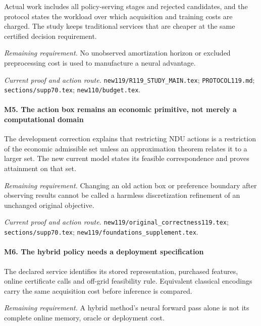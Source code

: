 Actual work includes all policy-serving stages and rejected candidates, and the protocol states the workload over which acquisition and training costs are charged. The study keeps traditional services that are cheaper at the same certified decision requirement.

\par\emph{Remaining requirement.} No unobserved amortization horizon or excluded preprocessing cost is used to manufacture a neural advantage.

\par\emph{Current proof and action route.} \nolinkurl{new119/R119_STUDY_MAIN.tex}; \nolinkurl{PROTOCOL119.md}; \nolinkurl{sections/supp70.tex}; \nolinkurl{new110/budget.tex}.

\paragraph{M5. The action box remains an economic primitive, not merely a computational domain}

The development correction explains that restricting NDU actions is a restriction of the economic admissible set unless an approximation theorem relates it to a larger set. The new current model states its feasible correspondence and proves attainment on that set.

\par\emph{Remaining requirement.} Changing an old action box or preference boundary after observing results cannot be called a harmless discretization refinement of an unchanged original objective.

\par\emph{Current proof and action route.} \nolinkurl{new119/original_correctness119.tex}; \nolinkurl{sections/supp70.tex}; \nolinkurl{new119/foundations_supplement.tex}.

\paragraph{M6. The hybrid policy needs a deployment specification}

The declared service identifies its stored representation, purchased features, online certificate calls and off-grid feasibility rule. Equivalent classical encodings carry the same acquisition cost before inference is compared.

\par\emph{Remaining requirement.} A hybrid method's neural forward pass alone is not its complete online memory, oracle or deployment cost.

